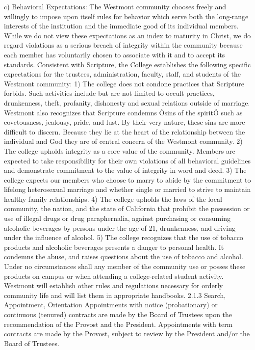 \documentclass[letterpaper, 11pt]{article}
\begin{document}
	c) Behavioral Expectations:
	The Westmont community chooses freely and willingly to impose upon itself rules for behavior which serve both the long-range interests of the institution and the immediate good of its individual members.  While we do not view these expectations as an index to maturity in Christ, we do regard violations as a serious breach of integrity within the community because each member has voluntarily chosen to associate with it and to accept its standards.
	Consistent with Scripture, the College establishes the following specific expectations for the trustees, administration, faculty, staff, and students of the Westmont community:
	1) The college does not condone practices that Scripture forbids.  Such activities include but are not limited to occult practices, drunkenness, theft, profanity, dishonesty and sexual relations outside of marriage.  Westmont also recognizes that Scripture condemns Òsins of the spiritÓ such as covetousness, jealousy, pride, and lust.  By their very nature, these sins are more difficult to discern.  Because they lie at the heart of the relationship between the individual and God they are of central concern of the Westmont community.
	2) The college upholds integrity as a core value of the community.  Members are expected to take responsibility for their own violations of all behavioral guidelines and demonstrate commitment to the value of integrity in word and deed.
	3) The college expects our members who choose to marry to abide by the commitment to lifelong heterosexual marriage and whether single or married to strive to maintain healthy family relationships.
	4) The college upholds the laws of the local community, the nation, and the state of California that prohibit the possession or use of illegal drugs or drug paraphernalia, against purchasing or consuming alcoholic beverages by persons under the age of 21, drunkenness, and driving under the influence of alcohol.
	5) The college recognizes that the use of tobacco products and alcoholic beverages presents a danger to personal health.  It condemns the abuse, and raises questions about the use of tobacco and alcohol.  Under no circumstances shall any member of the community use or posses these products on campus or when attending a college-related student activity.
	Westmont will establish other rules and regulations necessary for orderly community life and will list them in appropriate handbooks.
	2.1.3 Search, Appointment, Orientation
	Appointments with notice (probationary) or continuous (tenured) contracts are made by the Board of Trustees upon the recommendation of the Provost and the President. Appointments with term contracts are made by the Provost, subject to review by the President and/or the Board of Trustees.
\end{document}
